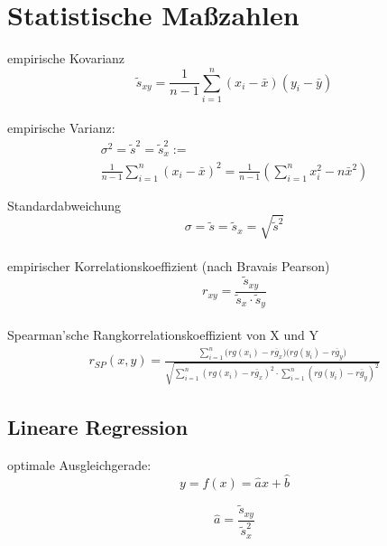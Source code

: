 \documentclass[a4paper, twocolumn]{article}
\begin{document}
\section{Statistische Maßzahlen}

    empirische Kovarianz
    \begin{displaymath}
        \tilde{s}_{xy} = \frac{1}{n-1} \sum^n_{i=1} (x_{i}-\bar{x}) (y_{i}-\bar{y})
    \end{displaymath} \\
    
    empirische Varianz:
    \begin{gather*}
        \sigma^2 = \tilde{s}^2 = \tilde{s}^2_x := \\
        \frac{1}{n-1} \sum^{n}_{i=1} (x_{i} - \bar{x})^2 = \frac{1}{n-1}(\sum^n_{i=1} x^2_i -n \bar x^2)
    \end{gather*}
    
    Standardabweichung
    \begin{displaymath}
      \sigma = \tilde s = \tilde s_x = \sqrt{\tilde s ^2}
    \end{displaymath} \\
    
    empirischer Korrelationskoeffizient (nach Bravais Pearson)
    \begin{displaymath}
     r_{xy} = \frac{\tilde s_{xy}}{\tilde s_x \cdot \tilde s_y}
    \end{displaymath} \\
    
    
    Spearman'sche Rangkorrelationskoeffizient von X und Y
    \begin{gather*}
      r_{SP}(x,y) = \frac
      {\sum\limits^n_{i=1} \Big(rg(x_i) - \overline{rg_x}) (rg(y_i)- \overline{rg_y} \Big) }
      { \sqrt{ \sum\limits^n_{i=1} (rg(x_i) - \bar{rg_x})^2 \cdot \sum\limits^n_{i=1} (rg(y_i) - \bar{rg_y})^2 }}
    \end{gather*}
    
    \subsection{Lineare Regression}
        optimale Ausgleichgerade:
        \begin{displaymath}
            y = f(x) = \hat a x + \hat b
        \end{displaymath}
        
        \begin{displaymath}
            \hat a = \frac{\tilde s_{xy}}{\tilde s^2_x}
        \end{displaymath}
        
\end{document}
